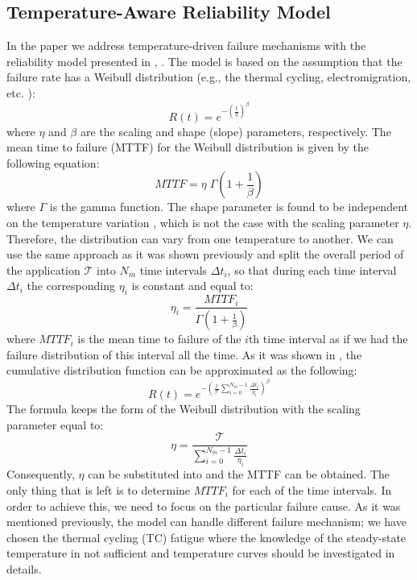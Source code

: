 \subsection{Temperature-Aware Reliability Model} \label{sec:reliability-model}
In the paper we address temperature-driven failure mechanisms with the reliability model presented in \cite{huang2009}, \cite{xiang2010}. The model is based on the assumption that the failure rate has a Weibull distribution (e.g., the thermal cycling, electromigration, etc. \cite{jedec2010}):
\[
  R(t) = e^{-(\frac{t}{\eta})^\beta}
\]
where $\eta$ and $\beta$ are the scaling and shape (slope) parameters, respectively. The mean time to failure (MTTF) for the Weibull distribution is given by the following equation:
\begin{equation} \label{eq:general-mttf}
  MTTF = \eta \; \Gamma(1 + \frac{1}{\beta})
\end{equation}
where $\Gamma$ is the gamma function. The shape parameter is found to be independent on the temperature variation \cite{chang2006}, which is not the case with the scaling parameter $\eta$. Therefore, the distribution can vary from one temperature to another. We can use the same approach as it was shown previously and split the overall period of the application $\mathcal{T}$ into $N_m$ time intervals $\Delta t_i$, so that during each time interval $\Delta t_i$ the corresponding $\eta_i$ is constant and equal to:
\begin{equation} \label{eq:eta-one}
  \eta_i = \frac{MTTF_i}{\Gamma(1 + \frac{1}{\beta})}
\end{equation}
where $MTTF_i$ is the mean time to failure of the $i$th time interval as if we had the failure distribution of this interval all the time. As it was shown in \cite{xiang2010}, the cumulative distribution function can be approximated as the following:
\[
  R(t) = e^{-(\frac{t}{\mathcal{T}} \sum_{i=0}^{N_m - 1} \frac{\Delta t_i}{\eta_i})^\beta}
\]
The formula keeps the form of the Weibull distribution with the scaling parameter equal to:
\begin{equation} \label{eq:eta-many}
  \eta = \frac{\mathcal{T}}{\sum_{i=0}^{N_m - 1} \frac{\Delta t_i}{\eta_i}}
\end{equation}
Consequently, $\eta$ can be substituted into  and the MTTF can be obtained. The only thing that is left is to determine $MTTF_i$ for each of the time intervals. In order to achieve this, we need to focus on the particular failure cause. As it was mentioned previously, the model can handle different failure mechanism; we have chosen the thermal cycling (TC) fatigue where the knowledge of the steady-state temperature in not sufficient and temperature curves should be investigated in details.

